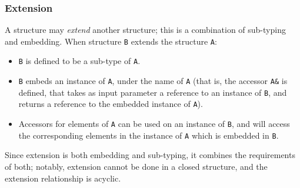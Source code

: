 \subsubsection{Extension}

A structure may \emph{extend} another structure; this is a combination
of sub-typing and embedding. When structure \verb|B| extends the
structure \verb|A|:
\begin{itemize}

    \item \verb|B| is defined to be a sub-type of \verb|A|.

    \item \verb|B| embeds an instance of \verb|A|, under the name of
    \verb|A| (that is, the accessor \verb|A&| is defined, that takes
    as input parameter a reference to an instance of \verb|B|, and
    returns a reference to the embedded instance of \verb|A|).

    \item Accessors for elements of \verb|A| can be used on an
    instance of \verb|B|, and will access the corresponding elements
    in the instance of \verb|A| which is embedded in \verb|B|.

\end{itemize}

Since extension is both embedding and sub-typing, it combines the
requirements of both; notably, extension cannot be done in a closed
structure, and the extension relationship is acyclic.

